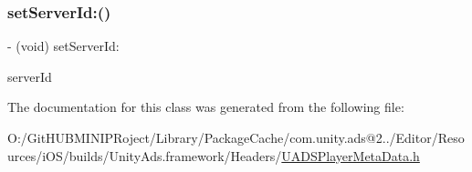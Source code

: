 \subsubsection{\texorpdfstring{setServerId:()}{setServerId:()}}
{\footnotesize\ttfamily -\/ (void) set\+Server\+Id\+: \begin{DoxyParamCaption}\item[{(N\+S\+String $\ast$)}]{server\+Id }\end{DoxyParamCaption}}



The documentation for this class was generated from the following file\+:\begin{DoxyCompactItemize}
\item 
O\+:/\+Git\+H\+U\+B\+M\+I\+N\+I\+P\+Roject/\+Library/\+Package\+Cache/com.\+unity.\+ads@2../\+Editor/\+Resources/i\+O\+S/builds/\+Unity\+Ads.\+framework/\+Headers/\mbox{\hyperlink{_u_a_d_s_player_meta_data_8h}{U\+A\+D\+S\+Player\+Meta\+Data.\+h}}\end{DoxyCompactItemize}

